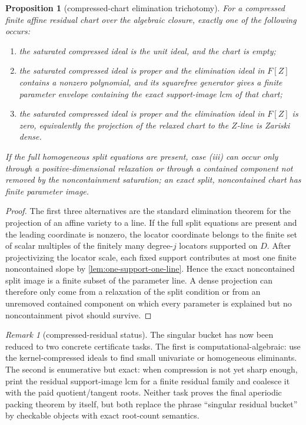 \documentclass[11pt]{article}
\newtheorem{proposition}[theorem]{Proposition}
\theoremstyle{definition}
\theoremstyle{remark}
\newtheorem{remark}[theorem]{Remark}
\begin{document}
\begin{proposition}[compressed-chart elimination trichotomy]
\label{prop:compressed-chart-elimination-trichotomy}
For a compressed finite affine residual chart over the algebraic closure, exactly
one of the following occurs:
\begin{enumerate}[label=\textup{(\roman*)},leftmargin=2.2em]
\item the saturated compressed ideal is the unit ideal, and the chart is empty;
\item the saturated compressed ideal is proper and the elimination ideal in $F[Z]$ contains a nonzero polynomial, and its
squarefree generator gives a finite parameter envelope containing the exact
support-image lcm of that chart;
\item the saturated compressed ideal is proper and the elimination ideal in $F[Z]$ is zero, equivalently the projection of the
relaxed chart to the $Z$-line is Zariski dense.
\end{enumerate}
If the full homogeneous split equations are present, case \textup{(iii)} can occur
only through a positive-dimensional relaxation or through a contained component
not removed by the noncontainment saturation; an exact split, noncontained chart
has finite parameter image.
\end{proposition}

\begin{proof}
The first three alternatives are the standard elimination theorem for the
projection of an affine variety to a line.  If the full split equations are
present and the leading coordinate is nonzero, the locator coordinate belongs to
the finite set of scalar multiples of the finitely many degree-$j$ locators
supported on $D$.  After projectivizing the locator scale, each fixed support
contributes at most one finite noncontained slope by
\cref{lem:one-support-one-line}.  Hence the exact noncontained split image is a
finite subset of the parameter line.  A dense projection can therefore only come
from a relaxation of the split condition or from an unremoved contained component
on which every parameter is explained but no noncontainment pivot should survive.
\end{proof}

\begin{remark}[compressed-residual status]
The singular bucket has now been reduced to two concrete certificate tasks.  The
first is computational-algebraic: use the kernel-compressed ideals to find small
univariate or homogeneous eliminants.  The second is enumerative but exact: when
compression is not yet sharp enough, print the residual support-image lcm for a
finite residual family and coalesce it with the paid quotient/tangent roots.
Neither task proves the final aperiodic packing theorem by itself, but both
replace the phrase ``singular residual bucket'' by checkable objects with exact
root-count semantics.
\end{remark}
\end{document}
